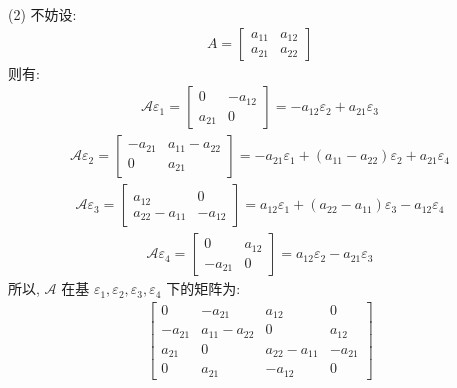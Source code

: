 \documentclass[11pt,a4paper,openany,oneside]{book}
\begin{document}
(2) 不妨设:
\begin{gather*}
A = 
\begin{bmatrix}
a_{11}  &  a_{12}  \\
a_{21}  &  a_{22}
\end{bmatrix}
\end{gather*}
则有:
\begin{gather*}
\mathcal{A}\varepsilon_1 = 
\begin{bmatrix}
0  &  -a_{12} \\
a_{21} &  0   
\end{bmatrix}=-a_{12}\varepsilon_2 + a_{21}\varepsilon_3
\end{gather*}
\begin{gather*}
\mathcal{A}\varepsilon_2 = 
\begin{bmatrix}
-a_{21}  &  a_{11}-a_{22} \\
0   &  a_{21}   
\end{bmatrix} = -a_{21}\varepsilon_1 + (a_{11} - a_{22})\varepsilon_2 + a_{21}\varepsilon_4
\end{gather*}
\begin{gather*}
\mathcal{A}\varepsilon_3 = 
\begin{bmatrix}
a_{12}  &    0  \\
a_{22} - a_{11} &  -a_{12}   
\end{bmatrix}= a_{12}\varepsilon_1 + (a_{22}-a_{11})\varepsilon_3 - a_{12}\varepsilon_4
\end{gather*}
\begin{gather*} 
\mathcal{A}\varepsilon_4 = 
\begin{bmatrix}
0  &    a_{12}  \\
-a_{21} &  0    
\end{bmatrix} = a_{12}\varepsilon_2 - a_{21}\varepsilon_3
\end{gather*}
所以,  $ \mathcal{A} $ 在基 $ \varepsilon_1, \varepsilon_2, \varepsilon_3, \varepsilon_4 $ 下的矩阵为:
\begin{gather*}
\begin{bmatrix}
0  &  -a_{21}  &  a_{12}  & 0  \\
-a_{21} & a_{11}-a_{22} & 0 & a_{12} \\
a_{21}  &  0  &  a_{22} - a_{11} &  -a_{21} \\
0  &  a_{21}  &  -a_{12}  &  0
\end{bmatrix}
\end{gather*} \\  \\  \\
\end{document}
